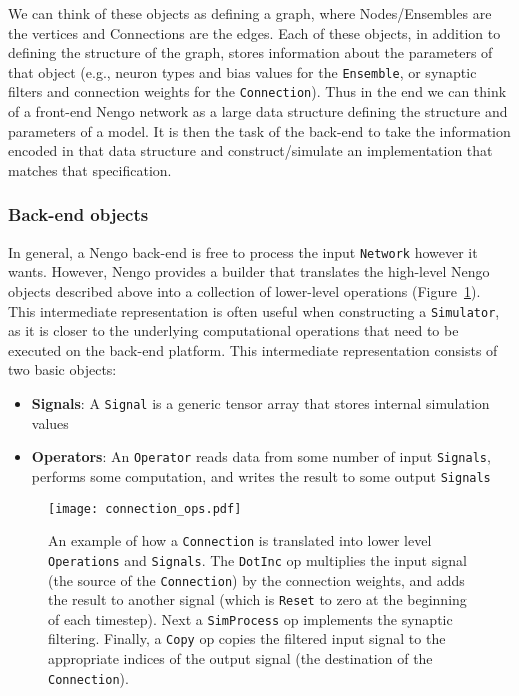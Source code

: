 \documentclass{article}
\begin{document}
We can think of these objects as defining a graph, where Nodes/Ensembles are the vertices and Connections are the edges.  Each of these objects, in addition to defining the structure of the graph, stores information about the parameters of that object (e.g., neuron types and bias values for the \texttt{Ensemble}, or synaptic filters and connection weights for the \texttt{Connection}).  Thus in the end we can think of a front-end Nengo network as a large data structure defining the structure and parameters of a model.  It is then the task of the back-end to take the information encoded in that data structure and construct/simulate an implementation that matches that specification.

\subsubsection{Back-end objects}

In general, a Nengo back-end is free to process the input \texttt{Network} however it wants.  However, Nengo provides a builder that translates the high-level Nengo objects described above into a collection of lower-level operations (Figure~\ref{fig:connection_ops}).  This intermediate representation is often useful when constructing a \texttt{Simulator}, as it is closer to the underlying computational operations that need to be executed on the back-end platform.  This intermediate representation consists of two basic objects:

\begin{itemize}
\item {\bf Signals}: A \texttt{Signal} is a generic tensor array that stores internal simulation values
\item {\bf Operators}: An \texttt{Operator} reads data from some number of input \texttt{Signals}, performs some computation, and writes the result to some output \texttt{Signals}
\end{itemize}

\begin{figure}
\centering
\texttt{[image: connection\_ops.pdf]}
\caption{An example of how a \texttt{Connection} is translated into lower level \texttt{Operations} and \texttt{Signals}.  The \texttt{DotInc} op multiplies the input signal (the source of the \texttt{Connection}) by the connection weights, and adds the result to another signal (which is \texttt{Reset} to zero at the beginning of each timestep).  Next a \texttt{SimProcess} op implements the synaptic filtering.  Finally, a \texttt{Copy} op copies the filtered input signal to the appropriate indices of the output signal (the destination of the \texttt{Connection}).}
\label{fig:connection_ops}
\end{figure}
\end{document}
